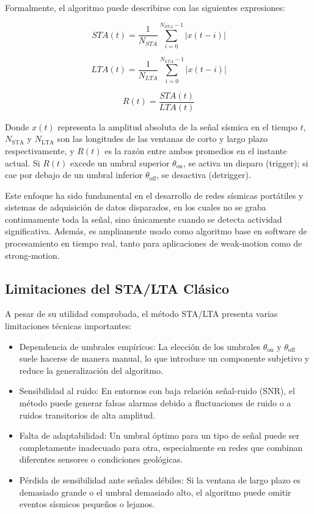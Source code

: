 Formalmente, el algoritmo puede describirse con las siguientes expresiones:

\begin{equation}
     STA(t)=\frac{1}{N_{STA}}\sum_{i=0}^{N_{STA}-1}\left | x(t-i)\right |
\end{equation}

\begin{equation}
     LTA(t)=\frac{1}{N_{LTA}}\sum_{i=0}^{N_{LTA}-1}\left | x(t-i)\right |
\end{equation}

\begin{equation}
     R(t)=\frac{STA(t)}{LTA(t)}
\end{equation}

Donde $x(t)$ representa la amplitud absoluta de la señal sísmica en el tiempo $t$, $N_{\text{STA}}$ y $N_{\text{LTA}}$ son las longitudes de las ventanas de corto y largo plazo respectivamente, y $R(t)$ es la razón entre ambos promedios en el instante actual. Si $R(t)$ excede un umbral superior $\theta_{\text{on}}$, se activa un disparo (trigger); si cae por debajo de un umbral inferior $\theta_{\text{off}}$, se desactiva (detrigger).

Este enfoque ha sido fundamental en el desarrollo de redes sísmicas portátiles y sistemas de adquisición de datos disparados, en los cuales no se graba continuamente toda la señal, sino únicamente cuando se detecta actividad significativa. Además, es ampliamente usado como algoritmo base en software de procesamiento en tiempo real, tanto para aplicaciones de weak-motion como de strong-motion.

\subsection{Limitaciones del STA/LTA Clásico}

A pesar de su utilidad comprobada, el método STA/LTA presenta varias limitaciones técnicas importantes:

\begin{itemize}
    \item Dependencia de umbrales empíricos: La elección de los umbrales $\theta_{\text{on}}$ y $\theta_{\text{off}}$ suele hacerse de manera manual, lo que introduce un componente subjetivo y reduce la generalización del algoritmo.
    \item Sensibilidad al ruido: En entornos con baja relación señal-ruido (SNR), el método puede generar falsas alarmas debido a fluctuaciones de ruido o a ruidos transitorios de alta amplitud.
    \item Falta de adaptabilidad: Un umbral óptimo para un tipo de señal puede ser completamente inadecuado para otra, especialmente en redes que combinan diferentes sensores o condiciones geológicas.
    \item Pérdida de sensibilidad ante señales débiles: Si la ventana de largo plazo es demasiado grande o el umbral demasiado alto, el algoritmo puede omitir eventos sísmicos pequeños o lejanos.

\end{itemize}


